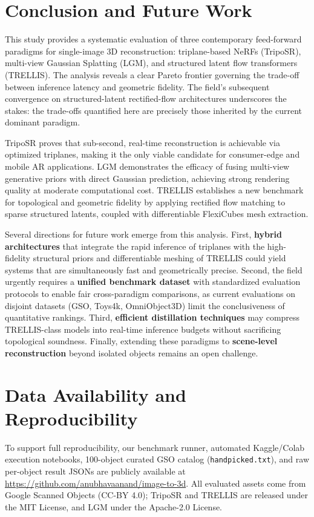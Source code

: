 \documentclass[10pt, conference]{IEEEtran}
\begin{document}
\section{Conclusion and Future Work}

This study provides a systematic evaluation of three contemporary feed-forward paradigms for single-image 3D reconstruction: triplane-based NeRFs (TripoSR), multi-view Gaussian Splatting (LGM), and structured latent flow transformers (TRELLIS). The analysis reveals a clear Pareto frontier governing the trade-off between inference latency and geometric fidelity. The field's subsequent convergence on structured-latent rectified-flow architectures \cite{triposg2025,hunyuan3d2_2025,sparc3d2025,lattice2025} underscores the stakes: the trade-offs quantified here are precisely those inherited by the current dominant paradigm.

TripoSR proves that sub-second, real-time reconstruction is achievable via optimized triplanes, making it the only viable candidate for consumer-edge and mobile AR applications. LGM demonstrates the efficacy of fusing multi-view generative priors with direct Gaussian prediction, achieving strong rendering quality at moderate computational cost. TRELLIS establishes a new benchmark for topological and geometric fidelity by applying rectified flow matching to sparse structured latents, coupled with differentiable FlexiCubes mesh extraction.

Several directions for future work emerge from this analysis. First, \textbf{hybrid architectures} that integrate the rapid inference of triplanes with the high-fidelity structural priors and differentiable meshing of TRELLIS could yield systems that are simultaneously fast and geometrically precise. Second, the field urgently requires a \textbf{unified benchmark dataset} with standardized evaluation protocols to enable fair cross-paradigm comparisons, as current evaluations on disjoint datasets (GSO, Toys4k, OmniObject3D) limit the conclusiveness of quantitative rankings. Third, \textbf{efficient distillation techniques} may compress TRELLIS-class models into real-time inference budgets without sacrificing topological soundness. Finally, extending these paradigms to \textbf{scene-level reconstruction} beyond isolated objects remains an open challenge.

\section*{Data Availability and Reproducibility}
To support full reproducibility, our benchmark runner, automated Kaggle/Colab execution notebooks, 100-object curated GSO catalog (\texttt{handpicked.txt}), and raw per-object result JSONs are publicly available at \url{https://github.com/anubhavaanand/image-to-3d}. All evaluated assets come from Google Scanned Objects (CC-BY 4.0); TripoSR and TRELLIS are released under the MIT License, and LGM under the Apache-2.0 License.
\end{document}

